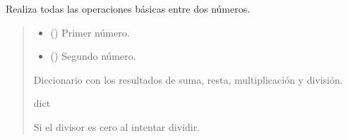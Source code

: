 \documentclass[a4paper,10pt,spanish]{sphinxmanual}
\begin{document}
\begin{fulllineitems}
\label{\detokenize{1_configuracion_inicial/src:src.operaciones.operaciones_basicas}}
\pysigstartsignatures
\pysiglinewithargsret
{}
{\sphinxparamcomma {}}
{}
\pysigstopsignatures
\sphinxAtStartPar
Realiza todas las operaciones básicas entre dos números.
\begin{quote}\begin{description}
\begin{itemize}
\item {} 
\sphinxAtStartPar
{} () \textendash{} Primer número.

\item {} 
\sphinxAtStartPar
{} () \textendash{} Segundo número.

\end{itemize}

\sphinxAtStartPar
Diccionario con los resultados de suma, resta, multiplicación y división.

\sphinxAtStartPar
dict

\sphinxAtStartPar
{} \textendash{} Si el divisor es cero al intentar dividir.

\end{description}\end{quote}

\end{fulllineitems}

\end{document}
